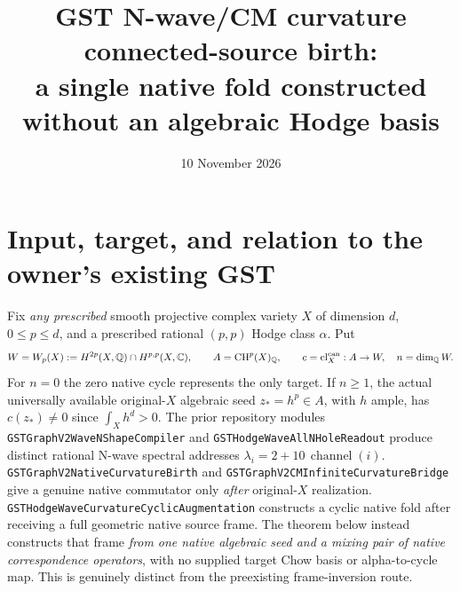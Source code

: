\documentclass[11pt]{article}
\title{GST N-wave/CM curvature connected-source birth:\\a single native fold constructed without an algebraic Hodge basis}
\date{10 November 2026}
\newcommand{\Q}{\mathbb Q}
\newcommand{\CH}{\mathrm{CH}}
\newcommand{\cl}{\mathrm{cl}}
\begin{document}
\maketitle

\section{Input, target, and relation to the owner's existing GST}
Fix \emph{any prescribed} smooth projective complex variety $X$ of dimension $d$, $0\le p\le d$, and a prescribed rational $(p,p)$ Hodge class $\alpha$. Put
\[
W=W_p(X):=H^{2p}(X,\Q)\cap H^{p,p}(X,\mathbb C),\qquad
A=\CH^p(X)_\Q,\qquad c=\cl_X^{\rm can}:A\to W,\quad n=\dim_\Q W.
\]
For $n=0$ the zero native cycle represents the only target. If $n\ge1$, the actual universally available original-$X$ algebraic seed $z_*=h^p\in A$, with $h$ ample, has $c(z_*)\ne0$ since $\int_Xh^d>0$.
The prior repository modules \texttt{GSTGraphV2WaveNShapeCompiler} and \texttt{GSTHodgeWaveAllNHoleReadout} produce distinct rational N-wave spectral addresses
\(\lambda_i=2+10\,\operatorname{channel}(i)\). \texttt{GSTGraphV2NativeCurvatureBirth} and \texttt{GSTGraphV2CMInfiniteCurvatureBridge} give a genuine native commutator only \emph{after} original-$X$ realization. \texttt{GSTHodgeWaveCurvatureCyclicAugmentation} constructs a cyclic native fold after receiving a full geometric native source frame. The theorem below instead constructs that frame \emph{from one native algebraic seed and a mixing pair of native correspondence operators}, with no supplied target Chow basis or alpha-to-cycle map. This is genuinely distinct from the preexisting frame-inversion route.
\end{document}

